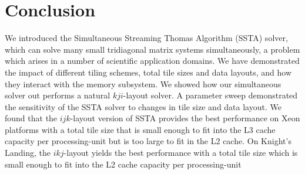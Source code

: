 \documentclass{sig-alternate-05-2015}
\makeatletter
\newcommand{\thickhline}{%
    \noalign {\ifnum 0=`}\fi \hrule height 1pt
    \futurelet \reserved@a \@xhline
}
\makeatother
\begin{document}



\section{Conclusion}
\label{sec:conclusion}


We introduced the Simultaneous Streaming Thomas Algorithm (SSTA) solver, which
  can solve many small tridiagonal matrix systems simultaneously, a
  problem which arises in a number of scientific application domains.
We have demonstrated the impact of different tiling schemes, total tile sizes
  and data layouts, and how they interact with the memory subsystem.
We showed how our simultaneous solver out performs a natural \(kji\)-layout
  solver.
A parameter sweep demonstrated the sensitivity of the SSTA solver to changes in
  tile size and data layout.
We found that the \(ijk\)-layout version of SSTA provides the best performance
  on Xeon platforms with a total tile size that is small enough to fit into the
  L3 cache capacity per processing-unit but is too large to fit in the L2 cache.
On Knight's Landing, the \(ikj\)-layout yields the best performance with a
  total tile size which is small enough to fit into the L2 cache capacity per
  processing-unit
\end{document}
